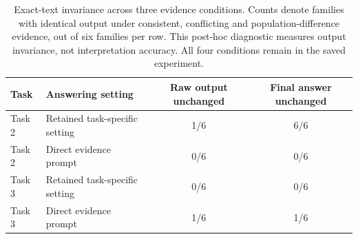 \begin{table}[H]
\centering
\caption{Exact-text invariance across three evidence conditions. Counts denote families with identical output under consistent, conflicting and population-difference evidence, out of six families per row. This post-hoc diagnostic measures output invariance, not interpretation accuracy. All four conditions remain in the saved experiment.}
\label{tab:evidence-change-response}
\begin{tabular}{llcc}
\toprule
Task & Answering setting & Raw output unchanged & Final answer unchanged \\
\midrule
Task 2 & Retained task-specific setting & 1/6 & 6/6 \\
Task 2 & Direct evidence prompt & 0/6 & 0/6 \\
Task 3 & Retained task-specific setting & 0/6 & 0/6 \\
Task 3 & Direct evidence prompt & 1/6 & 1/6 \\
\bottomrule
\end{tabular}
\end{table}
